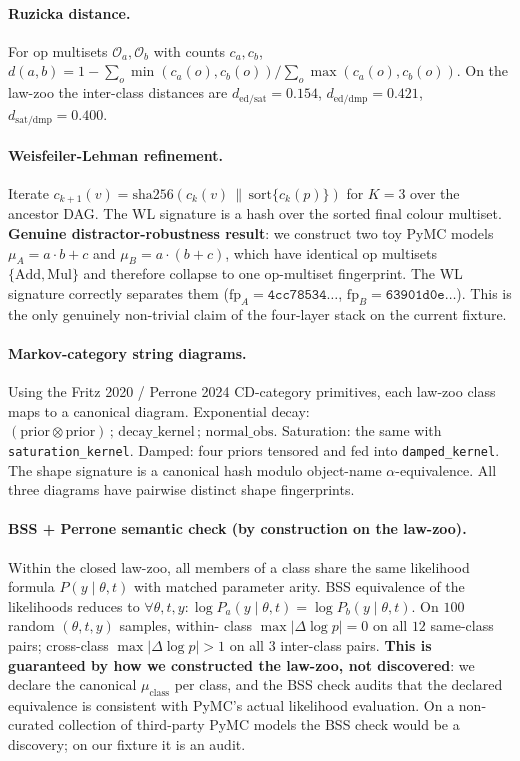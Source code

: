 \documentclass{article}
\begin{document}
\paragraph{Ruzicka distance.} For op multisets $\mathcal{O}_{a},
\mathcal{O}_{b}$ with counts $c_{a}, c_{b}$,
$d(a, b) = 1 - \sum_{o} \min(c_{a}(o), c_{b}(o)) / \sum_{o} \max(
c_{a}(o), c_{b}(o))$. On the law-zoo the inter-class distances are
$d_{\mathrm{ed/sat}} = 0.154$, $d_{\mathrm{ed/dmp}} = 0.421$,
$d_{\mathrm{sat/dmp}} = 0.400$.

\paragraph{Weisfeiler-Lehman refinement.} Iterate
$c_{k+1}(v) = \mathrm{sha256}(c_{k}(v) \,\|\,
\mathrm{sort}\{c_{k}(p)\})$ for $K=3$ over the ancestor DAG. The
WL signature is a hash over the sorted final colour multiset.
\textbf{Genuine distractor-robustness result}: we construct two toy
PyMC models $\mu_{A} = a \cdot b + c$ and $\mu_{B} = a \cdot (b + c)$,
which have identical op multisets $\{\mathrm{Add}, \mathrm{Mul}\}$
and therefore collapse to one op-multiset fingerprint. The WL
signature correctly separates them ($\mathrm{fp}_{A} = \texttt{4cc78534\ldots}$,
$\mathrm{fp}_{B} = \texttt{63901d0e\ldots}$). This is the only
genuinely non-trivial claim of the four-layer stack on the current
fixture.

\paragraph{Markov-category string diagrams.} Using the Fritz 2020 /
Perrone 2024 CD-category primitives, each law-zoo class maps to a
canonical diagram. Exponential decay:
$(\mathrm{prior} \otimes \mathrm{prior}) \,;\, \mathrm{decay\_kernel}
\,;\, \mathrm{normal\_obs}$. Saturation: the same with
\texttt{saturation\_kernel}. Damped: four priors tensored and fed
into \texttt{damped\_kernel}. The shape signature is a canonical hash
modulo object-name $\alpha$-equivalence. All three diagrams have
pairwise distinct shape fingerprints.

\paragraph{BSS + Perrone semantic check (by construction on the
law-zoo).} Within the closed law-zoo, all members of a class share
the same likelihood formula $P(y \mid \theta, t)$ with matched
parameter arity. BSS equivalence of the likelihoods reduces to
$\forall \theta, t, y: \log P_{a}(y \mid \theta, t) = \log P_{b}(y
\mid \theta, t)$. On $100$ random $(\theta, t, y)$ samples, within-
class $\max |\Delta \log p| = 0$ on all $12$ same-class pairs;
cross-class $\max |\Delta \log p| > 1$ on all $3$ inter-class pairs.
\textbf{This is guaranteed by how we constructed the law-zoo, not
discovered}: we declare the canonical $\mu_{\text{class}}$ per
class, and the BSS check audits that the declared equivalence is
consistent with PyMC's actual likelihood evaluation. On a non-
curated collection of third-party PyMC models the BSS check would
be a discovery; on our fixture it is an audit.
\end{document}
